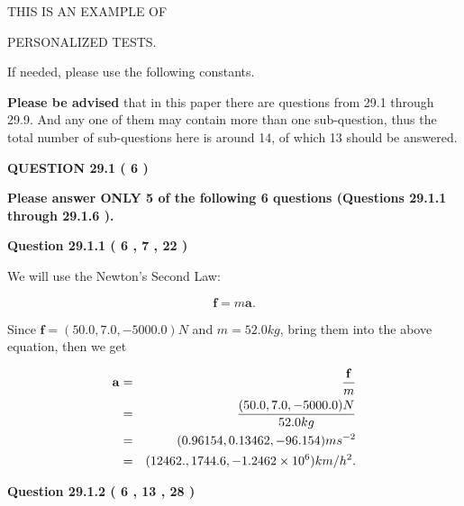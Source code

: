 \documentclass[12pt]{article}
\begin{document}
   
   
   
 \vspace{0.2in}
 
 
{\Huge  THIS IS AN EXAMPLE OF}
 
{\Huge  PERSONALIZED TESTS. }
 
If needed, please use the following constants.
 
 
 
{\textbf{\large{Please be advised}}} that in this paper there are questions from
29.1 through
29.9.
And any one of them may contain more than one sub-question, thus the total number
of sub-questions here is around 14, of which
13 should be answered.
 
\vspace{0.3in}
 
 
   
   
  
\vspace{0.2in}
  
{\textbf{\Large{QUESTION
29.1 
 (           6 )
}}}
  
  
{\textbf{\Large{Please answer ONLY  %
           5  %
 of the following  %
           6  %
 questions (Questions  %
29.1.1 %
 through  %
29.1.6 %
 ). }}}
   
   
  
\vspace{0.2in}
  
{\textbf{\Large{Question
29.1.1 
 (           6 ,           7 ,          22 )
}}}
  
  
 
 

We will use the Newton's Second Law:
 
\[
\mathbf{f}=m\mathbf{a}.
\]
 
Since $\mathbf{f}=( %
50.0,  %
7.0,  %
-5000.0 )N$
and $m= %
52.0 kg$, bring them into the above equation, then we get
 
\begin{eqnarray*}
\mathbf{a}&=&\frac{\mathbf{f}}m  \\
&=&\frac{(
50.0 ,
7.0 ,
-5000.0 )N
}{ %
52.0 kg}  \\
&=&(
0.96154 ,
0.13462,
-96.154
)ms^{-2} \\
&=&(
12462. ,
1744.6 ,
-1.2462 \times 10^{6}
)km/h^2.
\end{eqnarray*}
 
 
 
  
\vspace{0.2in}
  
{\textbf{\Large{Question
29.1.2 
 (           6 ,          13 ,          28 )
}}}
  
\end{document}
